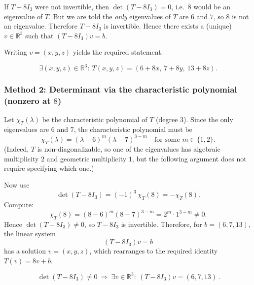\documentclass[12pt]{article}
\newcommand{\R}{\mathbb{R}}
\begin{document}
If $T-8I_3$ were not invertible, then $\det(T-8I_3)=0$, i.e.\ $8$ would be an eigenvalue of $T$.
But we are told the \emph{only} eigenvalues of $T$ are $6$ and $7$, so $8$ is not an eigenvalue.
Therefore $T-8I_3$ is invertible. Hence there exists a (unique) $v\in\R^3$ such that $(T-8I_3)v=b$.

Writing $v=(x,y,z)$ yields the required statement.

\[
\boxed{\,\exists (x,y,z)\in\R^3:\ T(x,y,z)=(6+8x,\ 7+8y,\ 13+8z).\,}
\]

\subsubsection{Method 2: Determinant via the characteristic polynomial (nonzero at $8$)}
Let $\chi_T(\lambda)$ be the characteristic polynomial of $T$ (degree $3$).
Since the only eigenvalues are $6$ and $7$, the characteristic polynomial must be
\[
\chi_T(\lambda)=(\lambda-6)^m(\lambda-7)^{3-m}
\quad\text{for some }m\in\{1,2\}.
\]
(Indeed, $T$ is non-diagonalizable, so one of the eigenvalues has algebraic multiplicity $2$ and geometric multiplicity $1$,
but the following argument does not require specifying which one.)

Now use
\[
\det(T-8I_3)=(-1)^3\,\chi_T(8)=-\chi_T(8).
\]
Compute:
\[
\chi_T(8)=(8-6)^m(8-7)^{3-m}=2^m\cdot 1^{3-m}\neq 0.
\]
Hence $\det(T-8I_3)\neq 0$, so $T-8I_3$ is invertible. Therefore, for $b=(6,7,13)$, the linear system
\[
(T-8I_3)v=b
\]
has a solution $v=(x,y,z)$, which rearranges to the required identity $T(v)=8v+b$.

\[
\boxed{\,\det(T-8I_3)\neq 0\ \Rightarrow\ \exists v\in\R^3:\ (T-8I_3)v=(6,7,13)\, }.
\]
\end{document}
